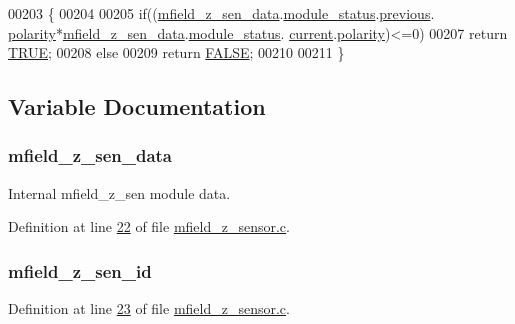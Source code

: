 \begin{DoxyCode}
00203                               \{
00204 
00205     \textcolor{keywordflow}{if}((\hyperlink{a00053_ae42bea09c571df9fad890518725d5cf4}{mfield\_z\_sen\_data}.\hyperlink{a00027_adfab5a5d8b45a93dfb13edb24e2b80e3}{module\_status}.\hyperlink{a00019_adcb859b2f3983a9c58deab28e59c333f}{previous}.
      \hyperlink{a00019_a45152a3cd909463d7c924c30b575a073}{polarity}*\hyperlink{a00053_ae42bea09c571df9fad890518725d5cf4}{mfield\_z\_sen\_data}.\hyperlink{a00027_adfab5a5d8b45a93dfb13edb24e2b80e3}{module\_status}.
      \hyperlink{a00019_acf41ffc11da291c2f9f0fcb02ee72b98}{current}.\hyperlink{a00019_a45152a3cd909463d7c924c30b575a073}{polarity})<=0)
00207     \textcolor{keywordflow}{return} \hyperlink{a00040_aa8cecfc5c5c054d2875c03e77b7be15d}{TRUE};
00208     \textcolor{keywordflow}{else}
00209     \textcolor{keywordflow}{return} \hyperlink{a00040_aa93f0eb578d23995850d61f7d61c55c1}{FALSE};
00210 
00211 \}
\end{DoxyCode}


\subsection{Variable Documentation}
\hypertarget{a00053_ae42bea09c571df9fad890518725d5cf4}{
\subsubsection[{mfield\+\_\+z\+\_\+sen\+\_\+data}]{ mfield\+\_\+z\+\_\+sen\+\_\+data}}\label{a00053_ae42bea09c571df9fad890518725d5cf4}


Internal mfield\+\_\+z\+\_\+sen module data. 



Definition at line \hyperlink{a00053_source_l00022}{22} of file \hyperlink{a00053_source}{mfield\+\_\+z\+\_\+sensor.\+c}.

\hypertarget{a00053_a8b08b70b0141a3a5c4b0f6097b49d437}{
\subsubsection[{mfield\+\_\+z\+\_\+sen\+\_\+id}]{ mfield\+\_\+z\+\_\+sen\+\_\+id}}\label{a00053_a8b08b70b0141a3a5c4b0f6097b49d437}


Definition at line \hyperlink{a00053_source_l00023}{23} of file \hyperlink{a00053_source}{mfield\+\_\+z\+\_\+sensor.\+c}.

